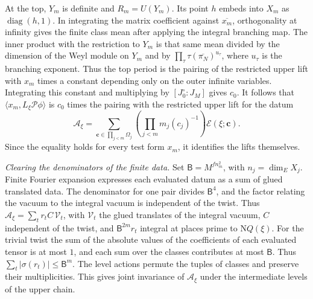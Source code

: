 At the top, \(Y_m\) is definite and \(R_m=U(Y_m)\).
Its point \(h\) embeds into \(X_m\) as \(\operatorname{diag}(h,1)\).
In integrating the matrix coefficient against \(\overline{x_m}\),
orthogonality at infinity gives the finite class mean after applying
the integral branching map. The inner product with the restriction to
\(Y_m\) is that same mean divided by the dimension of the Weyl module
on \(Y_m\) and by \(\prod_\tau\tau(\overline{\pi_N})^{u_\tau}\), where
\(u_\tau\) is the branching exponent.
Thus the top period is the pairing of the restricted upper lift with
\(x_m\) times a constant depending only on the outer infinite variables.
Integrating this constant and multiplying by \([J^\circ_0:J_M]\)
gives \(c_0\). It follows that \(\langle x_m,L_\xi\mathcal P\phi\rangle\)
is \(c_0\) times the pairing with the restricted upper lift for the datum
\[
 \mathcal A_\xi
   =\sum_{\boldsymbol c\in\prod_{j<m}\Omega_j}
         \left(\prod_{j<m}m_j(c_j)^{-1}\right)\mathcal E(\xi;\boldsymbol c).
\]
Since the equality holds for every test form \(x_m\), it identifies
the lifts themselves.

\emph{Clearing the denominators of the finite data.}
Set \(\mathsf B=M^{f n_m^2}\), with \(n_j=\dim_E X_j\).
Finite Fourier expansion expresses each evaluated datum as a sum of
glued translated data. The denominator for one pair divides
\(\mathsf B^4\), and the factor relating the vacuum to the integral
vacuum is independent of the twist.
Thus \(\mathcal A_\xi=\sum_t r_t C\,\mathcal V_t\), with \(\mathcal V_t\)
the glued translates of the integral vacuum, \(C\) independent of
the twist, and \(\mathsf B^{2m}r_t\) integral at places prime to
\(\mathrm NQ(\xi)\).
For the trivial twist the sum of the absolute values of the coefficients
of each evaluated tensor is at most \(1\), and each sum over the
classes contributes at most \(\mathsf B\). Thus
\(\sum_t|\sigma(r_t)|\le\mathsf B^m\).
The level actions permute the tuples of classes and preserve their
multiplicities. This gives joint invariance of \(\mathcal A_\xi\)
under the intermediate levels of the upper chain.

